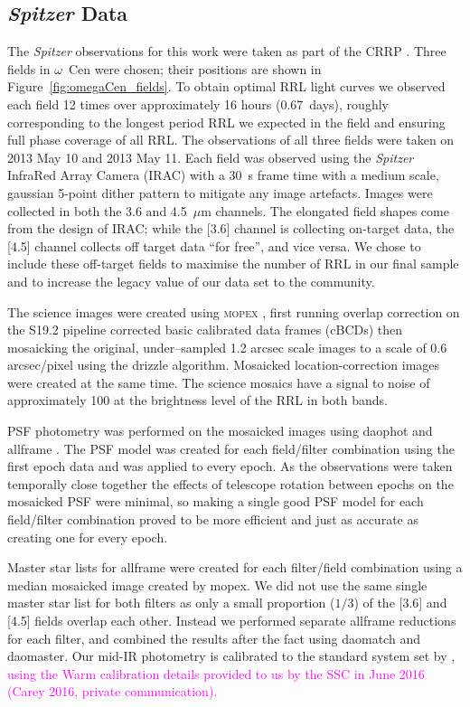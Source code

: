 \documentclass[a4paper,fleqn,usenatbib]{mnras}
\newcommand{\ocen}{$\omega$~Cen\xspace}
\newcommand{\um}{~$\mu$m\xspace}
\begin{document}
\subsection{{\em Spitzer} Data}
\label{sec:spitzer_reduction}
The \textit{Spitzer} observations for this work were taken as part of the CRRP \citet[][{\it Spitzer} PID 90002]{2012sptz.prop90002F}. Three fields in \ocen were chosen; their positions are shown in Figure~\ref{fig:omegaCen_fields}. To obtain optimal RRL light curves we observed each field 12 times over approximately 16 hours (0.67~days), roughly corresponding to the longest period RRL we expected in the field and ensuring full phase coverage of all RRL. The observations of all three fields were taken on 2013 May 10 and 2013 May 11. Each field was observed using the {\it Spitzer} InfraRed Array Camera (IRAC) \citep{2004ApJS..154...10F} with a 30~s frame time with a medium scale, gaussian 5-point dither pattern to mitigate any image artefacts. Images were collected in both the 3.6 and 4.5\um channels. 
The elongated field shapes come from the design of IRAC; while the [3.6] channel is collecting on-target data, the [4.5] channel collects off target data ``for free'', and vice versa. We chose to include these off-target fields to maximise the number of RRL in our final sample and to increase the legacy value of our data set to the community. 

The science images were created using \textsc{mopex} \citep{2006SPIE.6274E..0CM}, first running overlap correction on the S19.2 pipeline corrected basic calibrated data frames (cBCDs) then mosaicking the original, under--sampled 1.2 arcsec scale images to a scale of 0.6 arcsec/pixel using the drizzle algorithm. Mosaicked location-correction images were created at the same time. The science mosaics have a signal to noise of approximately 100 at the brightness level of the RRL in both bands. 

PSF photometry was performed on the mosaicked images using {\sc daophot} and {\sc allframe} \citep{1987PASP...99..191S, 1994PASP..106..250S}. The PSF model was created for each field/filter combination using the first epoch data and was applied to every epoch. As the observations were taken temporally close together the effects of telescope rotation between epochs on the mosaicked PSF were minimal, so making a single good PSF model for each field/filter combination proved to be more efficient and just as accurate as creating one for every epoch. 

Master star lists for {\sc allframe} were created for each filter/field combination using a median mosaicked image created by {\sc mopex}. We did not use the same single master star list for both filters as only a small proportion ($1/3$) of the [3.6] and [4.5] fields overlap each other. Instead we performed separate {\sc allframe} reductions for each filter, and combined the results after the fact using {\sc daomatch} and {\sc daomaster}. Our mid-IR photometry is calibrated to the standard system set by \citet{2005PASP..117..978R}, \textcolor{magenta}{using the Warm calibration details provided to us by the SSC in June 2016 (Carey 2016, private communication).}
\end{document}
